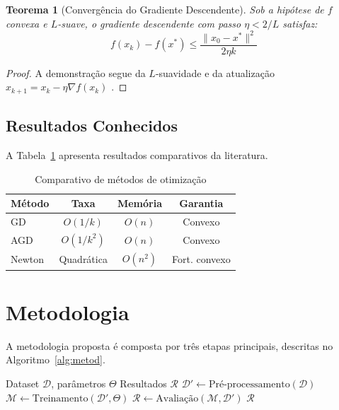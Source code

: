 \documentclass[
    12pt,                   %
    a4paper,                %
    openright,              %
    oneside,                %
    english,                %
    brazil                  %
]{abntex2}
\theoremstyle{plain}
\newtheorem{teorema}{Teorema}[chapter]
\theoremstyle{definition}
\theoremstyle{remark}
\begin{document}
\begin{teorema}[Converg\^encia do Gradiente Descendente]
\label{thm:conv}
Sob a hip\'otese de $f$ convexa e $L$-suave, o gradiente
descendente com passo $\eta < 2/L$ satisfaz:
\begin{equation}
    f(x_k) - f(x^*) \leq \frac{\|x_0 - x^*\|^2}{2\eta k}
    \label{eq:conv}
\end{equation}
\end{teorema}

\begin{proof}
A demonstra\c{c}\~ao segue da $L$-suavidade e da atualiza\c{c}\~ao
$ x_{k+1} = x_k - \eta \nabla f(x_k)$ \cite{Boyd2004Convex}.
\end{proof}

\section{Resultados Conhecidos}

A Tabela~\ref{tab:comparativo} apresenta resultados
comparativos da literatura.

\begin{table}[htbp]
\centering
\caption{Comparativo de m\'etodos de otimiza\c{c}\~ao}
\label{tab:comparativo}
\begin{tabular}{lccc}
\toprule
M\'etodo & Taxa & Mem\'oria & Garantia \\
\midrule
GD & $O(1/k)$ & $O(n)$ & Convexo \\
AGD & $O(1/k^2)$ & $O(n)$ & Convexo \\
Newton & Quadr\'atica & $O(n^2)$ & Fort. convexo \\
\bottomrule
\end{tabular}
\end{table}

\chapter{Metodologia}
\label{chap:metod}

A metodologia proposta \'e composta por tr\^es etapas
principais, descritas no Algoritmo~\ref{alg:metod}.

\begin{algorithm}[htbp]
\caption{Metodologia proposta}
\label{alg:metod}
\begin{algorithmic}[1]
\Require Dataset $\mathcal{D}$, par\^ametros $\Theta$
\Ensure Resultados $\mathcal{R}$
\State $\mathcal{D}' \gets \text{Pr\'e-processamento}(\mathcal{D})$
\State $\mathcal{M} \gets \text{Treinamento}(\mathcal{D}', \Theta)$
\State $\mathcal{R} \gets \text{Avalia\c{c}\~ao}(\mathcal{M}, \mathcal{D}')$
\State \Return $\mathcal{R}$
\end{algorithmic}
\end{algorithm}
\end{document}
